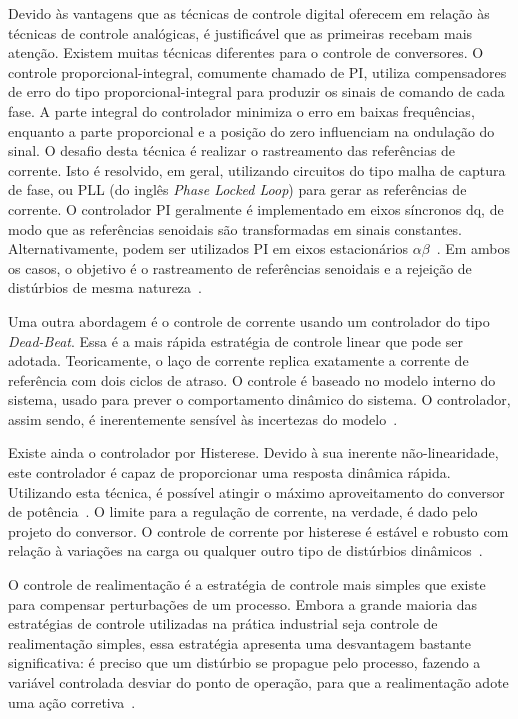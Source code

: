 	Devido às vantagens que as técnicas de controle digital oferecem em relação às técnicas de controle analógicas, é justificável que as primeiras recebam mais atenção. Existem muitas técnicas diferentes para o controle de conversores. O controle proporcional-integral, comumente chamado de PI, utiliza compensadores de erro do tipo proporcional-integral para produzir os sinais de comando de cada fase. A parte integral do controlador minimiza o erro em baixas frequências, enquanto a parte proporcional e a posição do zero influenciam na ondulação do sinal. O desafio desta técnica é realizar o rastreamento das referências de corrente. Isto é resolvido, em geral, utilizando circuitos do tipo malha de captura de fase, ou PLL (do inglês \emph{Phase Locked Loop}) para gerar as referências de corrente. O controlador PI geralmente é implementado em eixos síncronos dq, de modo que as referências senoidais são transformadas em sinais constantes. Alternativamente, podem ser utilizados PI em eixos estacionários $\alpha \beta$~\cite{ref:KAZMIERKOWSKI}. Em ambos os casos, o objetivo é o rastreamento de referências senoidais e a rejeição de distúrbios de mesma natureza~\cite{ref:AREERAK}.

	Uma outra abordagem é o controle de corrente usando um controlador do tipo \emph{Dead-Beat}. Essa é a mais rápida estratégia de controle linear que pode ser adotada. Teoricamente, o laço de corrente replica exatamente a corrente de referência com dois ciclos de atraso. O controle é baseado no modelo interno do sistema, usado para prever o comportamento dinâmico do sistema. O controlador, assim sendo, é inerentemente sensível às incertezas do modelo~\cite{ref:MALESANI}.

	Existe ainda o controlador por Histerese. Devido à sua inerente não-linearidade, este controlador é capaz de proporcionar uma resposta dinâmica rápida. Utilizando esta técnica, é possível atingir o máximo aproveitamento do conversor de potência~\cite{ref:YAO}. O limite para a regulação de corrente, na verdade, é dado pelo projeto do conversor. O controle de corrente por histerese é estável e robusto com relação à variações na carga ou qualquer outro tipo de distúrbios
	dinâmicos~\cite{ref:TENTI}.

	O controle de realimentação é a estratégia de controle mais simples que existe para compensar perturbações de um processo. Embora a grande maioria das estratégias de controle utilizadas na prática industrial seja controle de realimentação simples, essa estratégia apresenta uma desvantagem bastante significativa: é preciso que um distúrbio se propague pelo processo, fazendo a variável controlada desviar do ponto de operação, para que a realimentação adote uma ação corretiva~\cite{ref:SMITH}.

